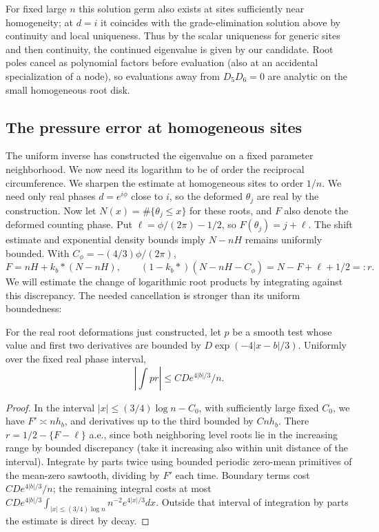 For fixed large \(n\) this solution germ also exists at sites sufficiently near homogeneity; at \(d=i\) it coincides with the grade-elimination solution above by continuity and local uniqueness. Thus by the scalar uniqueness for generic sites and then continuity, the continued eigenvalue is given by our candidate. Root poles cancel as polynomial factors before evaluation (also at an accidental specialization of a node), so evaluations away from \(D_5D_6=0\) are analytic on the small homogeneous root disk.

\subsection{The pressure error at homogeneous sites}

The uniform inverse has constructed the eigenvalue on a fixed parameter neighborhood. We now need its logarithm to be of order the reciprocal circumference. We sharpen the estimate at homogeneous sites to order \(1/n\). We need only real phases \(d=e^{i\phi}\) close to \(i\), so the deformed \(\theta_j\) are real by the construction. Now let \(N(x)=\#\{\theta_j\le x\}\) for these roots, and \(F\) also denote the deformed counting phase. Put \(\ell=\phi/(2\pi)-1/2\), so \(F(\theta_j)=j+\ell\). The shift estimate and exponential density bounds imply \(N-nH\) remains uniformly bounded. With \(C_\phi=-(4/3)\phi/(2\pi)\),
\[
 F=nH+k_b*(N-nH),\qquad (1-k_b*)(N-nH-C_\phi)=N-F+\ell+1/2=:r .
\]
We will estimate the change of logarithmic root products by integrating
against this discrepancy. The needed cancellation is stronger than its
uniform boundedness:
\begin{lemma}
\label{L:lem:pressure-quadrature}
For the real root deformations just constructed, let $p$ be a smooth
test whose value and first two derivatives are bounded by
$D\exp(-4|x-b|/3)$. Uniformly over the fixed real phase interval,
\[
 \left|\int p r\right|\le C D e^{4|b|/3}/n .
\]
\end{lemma}
\begin{proof}
In the interval \(|x|\le(3/4)\log n-C_0\), with sufficiently large fixed \(C_0\), we have \(F'\asymp n h_b\), and derivatives up to the third bounded by \(C n h_b\). There \(r=1/2-\{F-\ell\}\) a.e., since both neighboring level roots lie in the increasing range by bounded discrepancy (take it increasing also within unit distance of the interval). Integrate by parts twice using bounded periodic zero-mean primitives of the mean-zero sawtooth, dividing by \(F'\) each time. Boundary terms cost \(C D e^{4|b|/3}/n\); the remaining integral costs at most \(C D e^{4|b|/3}\int_{|x|\le(3/4)\log n} n^{-2} e^{4|x|/3}dx\). Outside that interval of integration by parts the estimate is direct by decay.
\end{proof}

